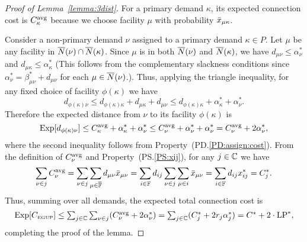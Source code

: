 \documentclass[11pt]{article}
\begin{document}
\begin{proof}[Proof of Lemma~\ref{lemma:3dist}]
  For a primary demand $\kappa$, its expected connection cost is
  $C_{\kappa}^{{\mbox{\scriptsize\rm avg}}}$ because we choose facility $\mu$ with
  probability ${\bar x}_{\mu\kappa}$.

  Consider a non-primary demand $\nu$ assigned to a primary demand
  $\kappa\in P$. Let $\mu$ be any facility in ${\overline{N}}(\nu) \cap
  {\overline{N}}(\kappa)$.  Since $\mu$ is in both ${\overline{N}}(\nu)$ and
  ${\overline{N}}(\kappa)$, we have $d_{\mu\nu} \leq \alpha_{\nu}^\ast$ and
  $d_{\mu\kappa} \leq \alpha_{\kappa}^\ast$ (This follows from the
  complementary slackness conditions since
  $\alpha_{\nu}^\ast=\beta_{\mu\nu}^\ast + d_{\mu\nu}$ for each
  $\mu\in {\overline{N}}(\nu)$.). Thus, applying the triangle inequality, for
  any fixed choice of facility $\phi(\kappa)$ we have
%
\begin{equation*}
    d_{\phi(\kappa)\nu} \leq d_{\phi(\kappa)\kappa}+d_{\mu\kappa}+d_{\mu\nu}
    \leq d_{\phi(\kappa)\kappa} + \alpha_{\kappa}^\ast + \alpha_{\nu}^\ast.
\end{equation*}
%
Therefore the expected distance from $\nu$ to its facility $\phi(\kappa)$ is 
%
\begin{equation*}
  \mbox{\rm Exp}[  d_{\phi(\kappa)\nu}   ] \le C^{{\mbox{\scriptsize\rm avg}}}_{\kappa} + \alpha_{\kappa}^\ast + \alpha_{\nu}^\ast 
  \leq C^{{\mbox{\scriptsize\rm avg}}}_{\nu} + \alpha_{\nu}^\ast + \alpha_{\nu}^\ast
   = C^{{\mbox{\scriptsize\rm avg}}}_{\nu} + 2\alpha_{\nu}^\ast,
\end{equation*}
%
  where the second inequality follows from Property~(PD.\ref{PD:assign:cost}).  
From the definition of $C^{{\mbox{\scriptsize\rm avg}}}_{\nu}$ and Property~(PS.\ref{PS:xij}), for any $j\in \mathbb{C}$ 
we have
%
\begin{equation*}
\sum_{\nu\in j} C^{{\mbox{\scriptsize\rm avg}}}_{\nu} = \sum_{\nu\in j}\sum_{\mu\in\overline{\mathbb{F}}}d_{\mu\nu}{\bar x}_{\mu\nu}
 			= \sum_{i\in\mathbb{F}} d_{ij}\sum_{\nu\in j}\sum_{\mu\in i}{\bar x}_{\mu\nu}
			= \sum_{i\in\mathbb{F}} d_{ij}x^\ast_{ij} 
			= C^\ast_j.
\end{equation*}
% 
Thus, summing over all demands, the expected total connection cost is
%
\begin{equation*}
    \mbox{\rm Exp}[C_{\mbox{\tiny\rm EGUP}}] \le 
			\textstyle{\sum_{j\in\mathbb{C}} \sum_{\nu\in j}} (C^{{\mbox{\scriptsize\rm avg}}}_{\nu} + 2\alpha_{\nu}^\ast) 
    	= \textstyle{\sum_{j\in\mathbb{C}}} (C_j^\ast + 2r_j\alpha_j^\ast)
 		= C^\ast + 2\cdot\mbox{\rm LP}^\ast,
\end{equation*}
%
completing the proof of the lemma.
\end{proof}
\end{document}
